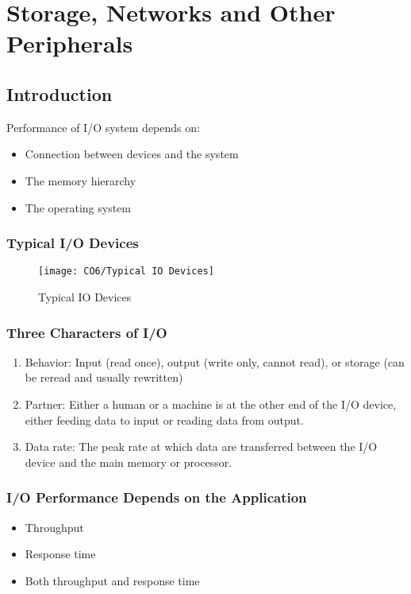 \newpage
\section{Storage, Networks and Other Peripherals}

\subsection{Introduction}
Performance of I/O system depends on:
\begin{itemize}\small
    \item Connection between devices and the system
    \item The memory hierarchy
    \item The operating system
\end{itemize}


\subsubsection{Typical I/O Devices}
\begin{figure}[!htb]
    \centering
    \texttt{[image: CO6/Typical IO Devices]}
    \caption{Typical IO Devices}
\end{figure}

\subsubsection{Three Characters of I/O}
\begin{enumerate}
    \item Behavior: Input (read once), output (write only, cannot read), or storage (can be reread and usually rewritten)
    \item Partner: Either a human or a machine is at the other end of the I/O device, either feeding data to input or reading data from output.
    \item Data rate: The peak rate at which data are transferred between the I/O device and the main memory or processor.    
\end{enumerate}

\subsubsection{I/O Performance Depends on the Application}
\begin{itemize}
    \item Throughput
    \item Response time
    \item Both throughput and response time
\end{itemize}

